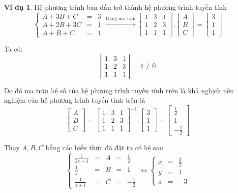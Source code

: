 \documentclass[12pt,a4paper,oneside]{book}
\theoremstyle{theorem}
\theoremstyle{definition}
\newtheorem{vd}[theorem2]{Ví dụ}
\begin{document}
\begin{vd}
Hệ phương trình ban đầu trở thành hệ phương trình tuyến tính
\[\left\{
\begin{array}{lcl}
 A+3B+C&=& 3\\
A+2B+3C&=&1 \\
 A+B+C&=&1
\end{array}
\right.\xrightarrow{\text{Dạng ma trận}}\left[
\begin{array}{ccc}
 1&3&1\\
1&2&3\\
 1&1&1
\end{array}
\right].\left[
\begin{array}{ccc}
 A\\
B\\
 C
\end{array}
\right]=\left[
\begin{array}{ccc}
 3\\
1\\
 1
\end{array}
\right]\]

Ta có: \[\left|
\begin{array}{ccc}
 1&3&1\\
1&2&3\\
 1&1&1
\end{array}
\right|=4\neq0\]

Do đó ma trận hệ số của hệ phương trình tuyến tính trên là khả nghịch nên nghiệm của hệ phương trình tuyến tính trên là 
\[
\left[
\begin{array}{ccc}
 A\\
B\\
 C
\end{array}
\right]=\left[
\begin{array}{ccc}
 1&3&1\\
1&2&3\\
 1&1&1
\end{array}
\right]^{-1}.\left[
\begin{array}{ccc}
 3\\
1\\
 1
\end{array}
\right]=\left[
\begin{array}{ccc}
 \displaystyle \frac{1}2\\
 \displaystyle 1\\
 \displaystyle -\frac{1}2
\end{array}
\right]\]

Thay $A,B,C$ bằng các biểu thức đã đặt ta có hệ sau
\[\left\{
\begin{array}{lclcl}
 \displaystyle \frac{1}{2x-1} &=&A&=&\displaystyle \frac{1}2\\[1.5ex]
 \displaystyle \frac{1}{y}&=& B&=&\displaystyle 1\\[1.5ex]
 \displaystyle  \frac{1}{z+1}&=&C&=&\displaystyle -\frac{1}2
\end{array}
\right.\Longleftrightarrow\left\{
\begin{array}{lclcl}
 x&=&\displaystyle \frac{3}2\\[1.5ex]
y&=&  \displaystyle 1\\[1.5ex]
 z&=&\displaystyle -3
\end{array}
\right.\]


\end{vd}
\end{document}
